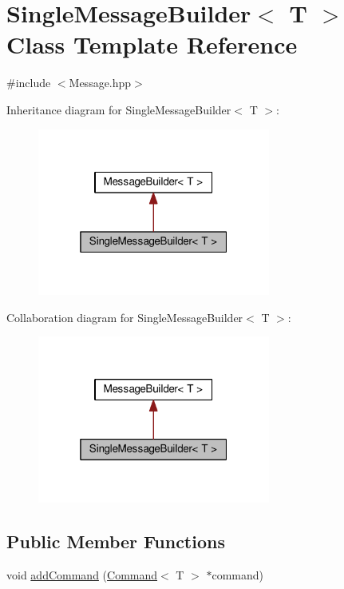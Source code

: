 \hypertarget{classSingleMessageBuilder}{}\section{Single\+Message\+Builder$<$ T $>$ Class Template Reference}
\label{classSingleMessageBuilder}


{\ttfamily \#include $<$Message.\+hpp$>$}



Inheritance diagram for Single\+Message\+Builder$<$ T $>$\+:\nopagebreak
\begin{figure}[H]
\begin{center}
\leavevmode
\includegraphics[width=217pt]{classSingleMessageBuilder__inherit__graph}
\end{center}
\end{figure}


Collaboration diagram for Single\+Message\+Builder$<$ T $>$\+:
\nopagebreak
\begin{figure}[H]
\begin{center}
\leavevmode
\includegraphics[width=217pt]{classSingleMessageBuilder__coll__graph}
\end{center}
\end{figure}
\subsection*{Public Member Functions}
\begin{DoxyCompactItemize}
\item 
void \hyperlink{classSingleMessageBuilder_a0b3e7ce89d33f4df111526695fe46125}{add\+Command} (\hyperlink{classCommand}{Command}$<$ T $>$ $\ast$command)
\end{DoxyCompactItemize}
